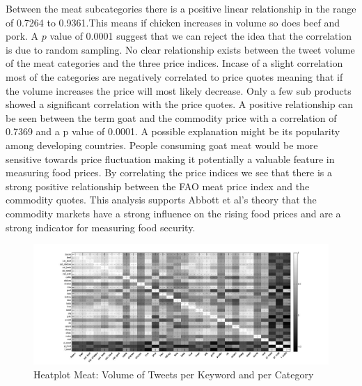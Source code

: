 Between the meat subcategories there is a  positive linear relationship in the range of 0.7264 to 0.9361.This means if chicken increases in volume so does beef and pork. A $p$ value of 0.0001 suggest that we can reject the idea that the correlation is due to random sampling. No clear relationship exists between the tweet volume of the meat categories and the three price indices. Incase of a slight correlation most of the categories are negatively correlated to price quotes meaning that if the volume increases the price will most likely decrease. Only a few sub products showed a significant correlation with the price quotes. A positive relationship can be seen between the term goat and the commodity price with a correlation of 0.7369 and a p value of 0.0001. A possible explanation might be its popularity among developing countries. People consuming goat meat would be more sensitive towards price fluctuation making it potentially a valuable feature in measuring food prices. By correlating the price indices we see that there is a strong positive relationship between the FAO meat price index and the commodity quotes. This analysis supports Abbott et al's theory \cite{abbott2009}  that the commodity markets have a strong influence on the rising food prices and are a strong indicator for measuring food security. 



\begin{figure}[H]
        \centering
         \includegraphics[width=1\textwidth ]{img/anal/meat_black}
              
        \caption{Heatplot Meat: Volume of Tweets per Keyword and per Category}
        \label{fig:distribution}
\end{figure}



